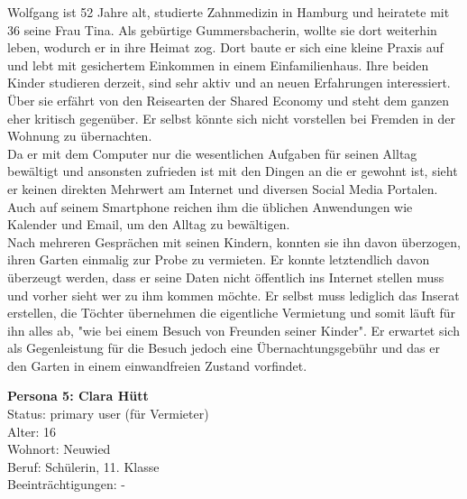 Wolfgang ist 52 Jahre alt, studierte Zahnmedizin in Hamburg und heiratete mit 36 seine Frau Tina. Als gebürtige Gummersbacherin, wollte sie dort weiterhin leben, wodurch er in ihre Heimat zog.
Dort baute er sich eine kleine Praxis auf und lebt mit gesichertem Einkommen in einem Einfamilienhaus. Ihre beiden Kinder studieren derzeit, sind sehr aktiv und an neuen Erfahrungen interessiert.
Über sie erfährt von den Reisearten der Shared Economy und steht dem ganzen eher kritisch gegenüber. Er selbst könnte sich nicht vorstellen bei Fremden in der Wohnung zu übernachten. \\
Da er mit dem Computer nur die wesentlichen Aufgaben für seinen Alltag bewältigt und ansonsten zufrieden ist mit den Dingen an die er gewohnt ist, sieht er keinen direkten Mehrwert am Internet und diversen Social Media Portalen.
Auch auf seinem Smartphone reichen ihm die üblichen Anwendungen wie Kalender und Email, um den Alltag zu bewältigen.\\

Nach mehreren Gesprächen mit seinen Kindern, konnten sie ihn davon überzogen, ihren Garten einmalig zur Probe zu vermieten. Er konnte letztendlich davon überzeugt werden, dass er seine Daten nicht öffentlich ins Internet stellen muss und vorher sieht wer zu ihm kommen möchte. Er selbst muss lediglich das Inserat erstellen, die Töchter übernehmen die eigentliche Vermietung und somit läuft für ihn alles ab, "wie bei einem Besuch von Freunden seiner Kinder".
Er erwartet sich als Gegenleistung für die Besuch jedoch eine Übernachtungsgebühr und das er den Garten in einem einwandfreien Zustand vorfindet.

\newpage
\textbf{Persona 5: Clara Hütt}\\
Status: primary user (für Vermieter)\\

Alter: 16\\
Wohnort: Neuwied\\
Beruf: Schülerin, 11. Klasse \\
Beeinträchtigungen: - \\

